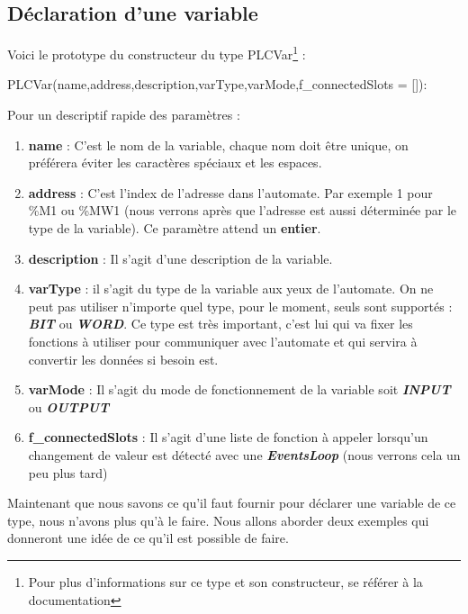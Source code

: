 \documentclass[12pt]{report}    %
\newcommand{\bold}[1]{{\bfseries #1}}
\newcommand{\ib}[1]{{\bfseries\itshape #1}}
\newcommand{\smallSkip}{\vskip 0.5cm}
\begin{document}
\subsection{Déclaration d'une variable}

Voici le prototype du constructeur du type PLCVar\footnote{Pour plus d'informations sur ce type et son constructeur, se référer à la documentation} :
\begin{pyCode}
PLCVar(name,address,description,varType,varMode,f_connectedSlots = []):
\end{pyCode}
Pour un descriptif rapide des paramètres :
\begin{enumerate}
\item \bold{name} : C'est le nom de la variable, chaque nom doit être unique, on préférera éviter les caractères spéciaux et les espaces.

\item \bold{address} : C'est l'index de l'adresse dans l'automate. Par exemple 1 pour \%M1 ou \%MW1 (nous verrons après que l'adresse est aussi déterminée par le type de la variable). Ce paramètre attend un \bold{entier}.

\item \bold{description} : Il s'agit d'une description de la variable.

\item \bold{varType} : il s'agit du type de la variable aux yeux de l'automate. On ne peut pas utiliser n'importe quel type, pour le moment, seuls sont supportés : \ib{BIT} ou \ib{WORD}. Ce type est très important, c'est lui qui va fixer les fonctions à utiliser pour communiquer avec l'automate et qui servira à convertir les données si besoin est.

\item \bold{varMode} : Il s'agit du mode de fonctionnement de la variable soit \ib{INPUT} ou \ib{OUTPUT}

\item \bold{f\_connectedSlots} : Il s'agit d'une liste de fonction à appeler lorsqu'un changement de valeur est détecté avec une \ib{EventsLoop} (nous verrons cela un peu plus tard)
\end{enumerate}
\smallSkip

Maintenant que nous savons ce qu'il faut fournir pour déclarer une variable de ce type, nous n'avons plus qu'à le faire. Nous allons aborder deux exemples qui donneront une idée de ce qu'il est possible de faire.
\end{document}
